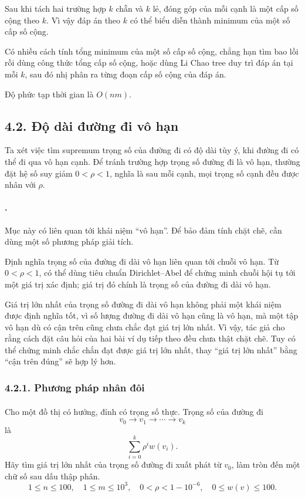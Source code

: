 \documentclass[11pt]{article}
\begin{document}
Sau khi tách hai trường hợp \(k\) chẵn và \(k\) lẻ, đóng góp của mỗi cạnh là
một cấp số cộng theo \(k\). Vì vậy đáp án theo \(k\) có thể biểu diễn thành
minimum của một số cấp số cộng.

Có nhiều cách tính tổng minimum của một số cấp số cộng, chẳng hạn tìm bao lồi
rồi dùng công thức tổng cấp số cộng, hoặc dùng Li Chao tree duy trì đáp án tại
mỗi \(k\), sau đó nhị phân ra từng đoạn cấp số cộng của đáp án.

Độ phức tạp thời gian là \(O(nm)\).

\subsection*{4.2. Độ dài đường đi vô hạn}

Ta xét việc tìm supremum trọng số của đường đi có độ dài tùy ý, khi đường đi có
thể đi qua vô hạn cạnh. Để tránh trường hợp trọng số đường đi là vô hạn, thường
đặt hệ số suy giảm \(0<\rho<1\), nghĩa là sau mỗi cạnh, mọi trọng số cạnh đều
được nhân với \(\rho\).

\paragraph{.}
Mục này có liên quan tới khái niệm ``vô hạn''. Để bảo đảm tính chặt chẽ, cần
dùng một số phương pháp giải tích.

Định nghĩa trọng số của đường đi dài vô hạn liên quan tới chuỗi vô hạn. Từ
\(0<\rho<1\), có thể dùng tiêu chuẩn Dirichlet--Abel để chứng minh chuỗi hội
tụ tới một giá trị xác định; giá trị đó chính là trọng số của đường đi dài vô
hạn.

Giá trị lớn nhất của trọng số đường đi dài vô hạn không phải một khái niệm được
định nghĩa tốt, vì số lượng đường đi dài vô hạn cũng là vô hạn, mà một tập vô
hạn dù có cận trên cũng chưa chắc đạt giá trị lớn nhất. Vì vậy, tác giả cho
rằng cách đặt câu hỏi của hai bài ví dụ tiếp theo đều chưa thật chặt chẽ. Tuy
có thể chứng minh chắc chắn đạt được giá trị lớn nhất, thay ``giá trị lớn
nhất'' bằng ``cận trên đúng'' sẽ hợp lý hơn.

\subsubsection*{4.2.1. Phương pháp nhân đôi}

\paragraph{}
Cho một đồ thị có hướng, đỉnh có trọng số thực. Trọng số của đường đi
\[
  v_0\to v_1\to\cdots\to v_k
\]
là
\[
  \sum_{i=0}^{k}\rho^i w(v_i).
\]
Hãy tìm giá trị lớn nhất của trọng số đường đi xuất phát từ \(v_0\), làm tròn
đến một chữ số sau dấu thập phân.
\[
  1\le n\le100,\quad
  1\le m\le10^3,\quad
  0<\rho<1-10^{-6},\quad
  0\le w(v)\le100.
\]
\end{document}
